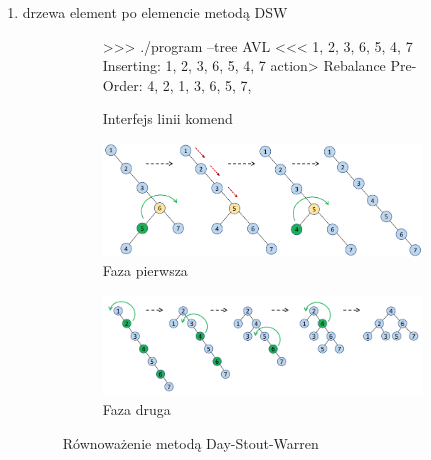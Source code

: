 \newpage


\begin{enumerate}[resume=actions]
    \item \textcolor{PUT-Blue}{} drzewa element po elemencie metodą DSW


\begin{figure}[H]
    \begin{subfigure}{\textwidth}
\begin{TcblistingMintedTerminal}
>>>  ./program --tree AVL <<< 1, 2, 3, 6, 5, 4, 7
Inserting: 1, 2, 3, 6, 5, 4, 7
action> Rebalance
Pre-Order:  4, 2, 1, 3, 6, 5, 7,
\end{TcblistingMintedTerminal}
        \caption{Interfejs linii komend}
        \label{fig:tree:rebalance:code}
    \end{subfigure}

    \centering
    \begin{subfigure}{\textwidth}
        \includegraphics[width=\textwidth]{Figures/DSW-Phase1.png} 
        \caption{Faza pierwsza}
        \label{fig:tree:rebalance:phase1}
    \end{subfigure}

    \begin{subfigure}{\textwidth}
        \includegraphics[width=\textwidth]{Figures/DSW-Phase2.png}
        \caption{Faza druga}
        \label{fig:tree:rebalance:phase2}
    \end{subfigure}
    \caption{Równoważenie metodą Day-Stout-Warren}
\end{figure}
    
\end{enumerate}

